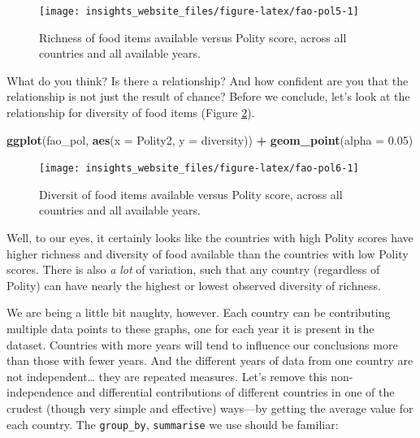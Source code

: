\documentclass[]{book}
\newenvironment{Shaded}{\begin{snugshade}}{\end{snugshade}}
\newcommand{\DataTypeTok}[1]{\textcolor[rgb]{0.13,0.29,0.53}{#1}}
\newcommand{\FloatTok}[1]{\textcolor[rgb]{0.00,0.00,0.81}{#1}}
\newcommand{\KeywordTok}[1]{\textcolor[rgb]{0.13,0.29,0.53}{\textbf{#1}}}
\newcommand{\NormalTok}[1]{#1}
\newcommand{\OperatorTok}[1]{\textcolor[rgb]{0.81,0.36,0.00}{\textbf{#1}}}
\newcommand{\StringTok}[1]{\textcolor[rgb]{0.31,0.60,0.02}{#1}}
\begin{document}
\begin{figure}

{\centering \texttt{[image: insights\_website\_files/figure-latex/fao-pol5-1]} 

}

\caption{Richness of food items available versus Polity score, across all countries and all available years.}\label{fig:fao-pol5}
\end{figure}

What do you think? Is there a relationship? And how confident are you that the relationship is not just the result of chance? Before we conclude, let's look at the relationship for diversity of food items (Figure \ref{fig:fao-pol6}).

\begin{Shaded}
\begin{Highlighting}[]
\KeywordTok{ggplot}\NormalTok{(fao_pol, }\KeywordTok{aes}\NormalTok{(}\DataTypeTok{x =}\NormalTok{ Polity2, }\DataTypeTok{y =}\NormalTok{ diversity)) }\OperatorTok{+}
\StringTok{  }\KeywordTok{geom_point}\NormalTok{(}\DataTypeTok{alpha =} \FloatTok{0.05}\NormalTok{)}
\end{Highlighting}
\end{Shaded}

\begin{figure}

{\centering \texttt{[image: insights\_website\_files/figure-latex/fao-pol6-1]} 

}

\caption{Diversit of food items available versus Polity score, across all countries and all available years.}\label{fig:fao-pol6}
\end{figure}

Well, to our eyes, it certainly looks like the countries with high Polity scores have higher richness and diversity of food available than the countries with low Polity scores. There is also \emph{a lot} of variation, such that any country (regardless of Polity) can have nearly the highest or lowest observed diversity of richness.

We are being a little bit naughty, however. Each country can be contributing multiple data points to these graphs, one for each year it is present in the dataset. Countries with more years will tend to influence our conclusions more than those with fewer years. And the different years of data from one country are not independent\ldots{} they are repeated measures. Let's remove this non-independence and differential contributions of different countries in one of the crudest (though very simple and effective) ways---by getting the average value for each country. The \texttt{group\_by}, \texttt{summarise} we use should be familiar:
\end{document}
